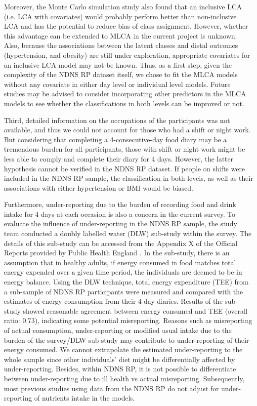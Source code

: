 Moreover, the Monte Carlo simulation study \parencite{bray2015eliminating} also found that an inclusive LCA (i.e. LCA with covariates) would probably perform better than non-inclusive LCA and has the potential to reduce bias of class assignment. However, whether this advantage can be extended to MLCA in the current project is unknown. Also, because the associations between the latent classes and distal outcomes (hypertension, and obesity) are still under exploration, appropriate covariates for an inclusive LCA model may not be known. Thus, as a first step, given the complexity of the NDNS RP dataset itself, we chose to fit the MLCA models without any covariate in either day level or individual level models. Future studies may be advised to consider incorporating other predictors in the MLCA models to see whether the classifications in both levels can be improved or not. 

Third, detailed information on the occupations of the participants was not available, and thus we could not account for those who had a shift or night work. But considering that completing a 4-consecutive-day food diary may be a tremendous burden for all participants, those with shift or night work might be less able to comply and complete their diary for 4 days. However, the latter hypothesis cannot be verified in the NDNS RP dataset. If people on shifts were included in the NDNS RP sample, the classification in both levels, as well as their associations with either hypertension or BMI would be biased. 

Furthermore, under-reporting due to the burden of recording food and drink intake for 4 days at each occasion is also a concern in the current survey. To evaluate the influence of under-reporting in the NDNS RP sample, the study team conducted a doubly labelled water (DLW) sub-study within the survey. The details of this sub-study can be accessed from the Appendix X of the Official Reports provided by Public Health England \parencite{bates2014national,roberts2018national,NDNSofficial}. In the sub-study, there is an assumption that in healthy adults, if energy consumed in food matches total energy expended over a given time period, the individuals are deemed to be in energy balance. Using the DLW technique, total energy expenditure (TEE) from a sub-sample of NDNS RP participants were measured and compared with the estimates of energy consumption from their 4 day diaries. Results of the sub-study showed reasonable agreement between energy consumed and TEE (overall ratio: 0.73), indicating some potential misreporting. Reasons such as misreporting of actual consumption, under-reporting or modified usual intake due to the burden of the survey/DLW sub-study may contribute to under-reporting of their energy consumed. We cannot extrapolate the estimated under-reporting to the whole sample since other individuals' diet might be differentially affected by under-reporting. Besides, within NDNS RP, it is not possible to differentiate between under-reporting due to ill health vs actual misreporting. Subsequently, most previous studies using data from the NDNS RP do not adjust for under-reporting of nutrients intake in the models.

